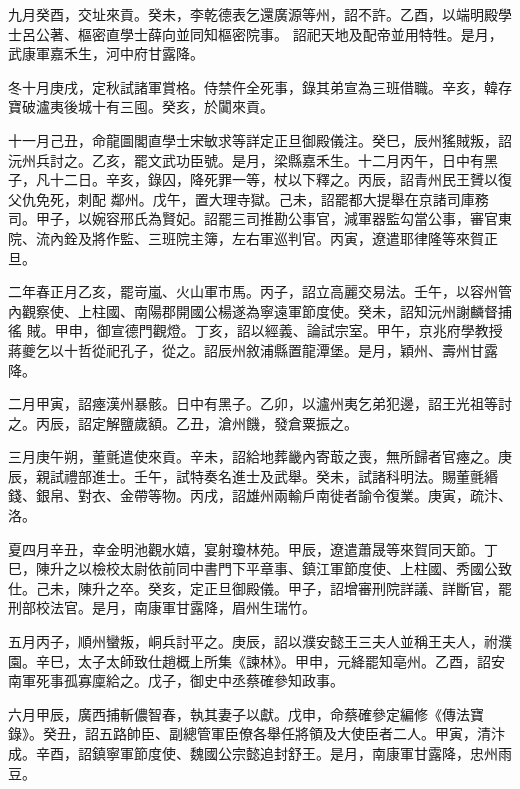 \begin{pinyinscope}
 九月癸酉，交址來貢。癸未，李乾德表乞還廣源等州，詔不許。乙酉，以端明殿學士呂公著、樞密直學士薛向並同知樞密院事。
 詔祀天地及配帝並用特牲。是月，武康軍嘉禾生，河中府甘露降。



 冬十月庚戌，定秋試諸軍賞格。侍禁仵全死事，錄其弟宣為三班借職。辛亥，韓存寶破瀘夷後城十有三囤。癸亥，於闐來貢。



 十一月己丑，命龍圖閣直學士宋敏求等詳定正旦御殿儀注。癸巳，辰州猺賊叛，詔沅州兵討之。乙亥，罷文武功臣號。是月，梁縣嘉禾生。十二月丙午，日中有黑子，凡十二日。辛亥，錄囚，降死罪一等，杖以下釋之。丙辰，詔青州民王贇以復父仇免死，刺配
 鄰州。戊午，置大理寺獄。己未，詔罷都大提舉在京諸司庫務司。甲子，以婉容邢氏為賢妃。詔罷三司推勘公事官，減軍器監勾當公事，審官東院、流內銓及將作監、三班院主簿，左右軍巡判官。丙寅，遼遣耶律隆等來賀正旦。



 二年春正月乙亥，罷岢嵐、火山軍市馬。丙子，詔立高麗交易法。壬午，以容州管內觀察使、上柱國、南陽郡開國公楊遂為寧遠軍節度使。癸未，詔知沅州謝麟督捕徭
 賊。甲申，御宣德門觀燈。丁亥，詔以經義、論試宗室。甲午，京兆府學教授蔣夔乞以十哲從祀孔子，從之。詔辰州敘浦縣置龍潭堡。是月，穎州、壽州甘露降。



 二月甲寅，詔瘞漢州暴骸。日中有黑子。乙卯，以瀘州夷乞弟犯邊，詔王光祖等討之。丙辰，詔定解鹽歲額。乙丑，滄州饑，發倉粟振之。



 三月庚午朔，董氈遣使來貢。辛未，詔給地葬畿內寄菆之喪，無所歸者官瘞之。庚辰，親試禮部進士。壬午，試特奏名進士及武舉。癸未，試諸科明法。賜董氈緡
 錢、銀帛、對衣、金帶等物。丙戌，詔雄州兩輸戶南徙者諭令復業。庚寅，疏汴、洛。



 夏四月辛丑，幸金明池觀水嬉，宴射瓊林苑。甲辰，遼遣蕭晟等來賀同天節。丁巳，陳升之以檢校太尉依前同中書門下平章事、鎮江軍節度使、上柱國、秀國公致仕。己未，陳升之卒。癸亥，定正旦御殿儀。甲子，詔增審刑院詳議、詳斷官，罷刑部校法官。是月，南康軍甘露降，眉州生瑞竹。



 五月丙子，順州蠻叛，峒兵討平之。庚辰，詔以濮安懿王三夫人並稱王夫人，祔濮
 園。辛巳，太子太師致仕趙概上所集《諫林》。甲申，元絳罷知亳州。乙酉，詔安南軍死事孤寡廩給之。戊子，御史中丞蔡確參知政事。



 六月甲辰，廣西捕斬儂智春，執其妻子以獻。戊申，命蔡確參定編修《傳法寶錄》。癸丑，詔五路帥臣、副總管軍臣僚各舉任將領及大使臣者二人。甲寅，清汴成。辛酉，詔鎮寧軍節度使、魏國公宗懿追封舒王。是月，南康軍甘露降，忠州雨豆。




\end{pinyinscope}
